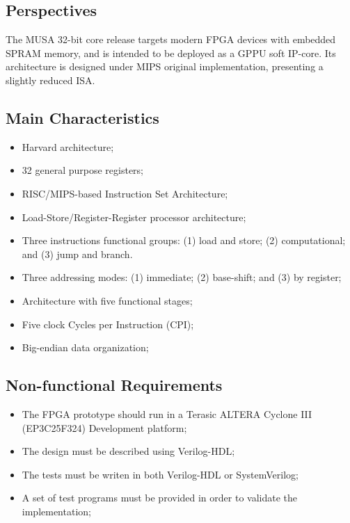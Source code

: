 \documentclass{article}
\begin{document}
 \subsection{Perspectives}
    
  The MUSA 32-bit core release targets modern FPGA devices with embedded SPRAM memory, and is intended to be deployed as a GPPU soft IP-core. Its architecture is designed under MIPS original implementation, presenting a slightly reduced ISA.
  
  \subsection{Main Characteristics}
  
  \begin{itemize}
   \item Harvard architecture;
   \item 32 general purpose registers;
   \item RISC/MIPS-based Instruction Set Architecture;
   \item Load-Store/Register-Register processor architecture;
   \item Three instructions functional groups: (1) load and store; (2) computational; and (3) jump and branch.
   \item Three addressing modes: (1) immediate; (2) base-shift; and (3) by register;
   \item Architecture with five functional stages;
   \item Five clock Cycles per Instruction (CPI);
   \item Big-endian data organization;
  \end{itemize}

  \subsection{Non-functional Requirements}
  
  \begin{itemize}
   \item The FPGA prototype should run in a Terasic ALTERA Cyclone III (EP3C25F324) Development platform;
   \item The design must be described using Verilog-HDL;
   \item The tests must be writen in both Verilog-HDL or SystemVerilog;
   \item A set of test programs must be provided in order to validate the implementation;
  \end{itemize}
\end{document}
